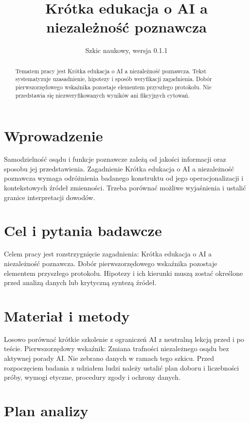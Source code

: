 \documentclass[11pt,a4paper]{article}
\title{Krótka edukacja o AI a niezależność poznawcza}
\author{}
\date{Szkic naukowy, wersja 0.1.1}
\begin{document}
\maketitle

\begin{abstract}

Tematem pracy jest Krótka edukacja o AI a niezależność poznawcza. Tekst systematyzuje uzasadnienie, hipotezy i sposób weryfikacji zagadnienia. Dobór pierwszorzędowego wskaźnika pozostaje elementem przyszłego protokołu. Nie przedstawia się niezweryfikowanych wyników ani fikcyjnych cytowań.

\end{abstract}

\section{Wprowadzenie}

Samodzielność osądu i funkcje poznawcze zależą od jakości informacji oraz sposobu jej przedstawienia. Zagadnienie Krótka edukacja o AI a niezależność poznawcza wymaga odróżnienia badanego konstruktu od jego operacjonalizacji i kontekstowych źródeł zmienności. Trzeba porównać możliwe wyjaśnienia i ustalić granice interpretacji dowodów.

\section{Cel i pytania badawcze}

Celem pracy jest rozstrzygnięcie zagadnienia: Krótka edukacja o AI a niezależność poznawcza. Dobór pierwszorzędowego wskaźnika pozostaje elementem przyszłego protokołu. Hipotezy i ich kierunki muszą zostać określone przed analizą danych lub krytyczną syntezą źródeł.

\section{Materiał i metody}

Losowo porównać krótkie szkolenie z ograniczeń AI z neutralną lekcją przed i po teście. Pierwszorzędowy wskaźnik: Zmiana trafności niezależnego osądu bez aktywnej porady AI. Nie zebrano danych w ramach tego szkicu. Przed rozpoczęciem badania z udziałem ludzi należy ustalić plan doboru i liczebności próby, wymogi etyczne, procedury zgody i ochrony danych.

\section{Plan analizy}
\end{document}
